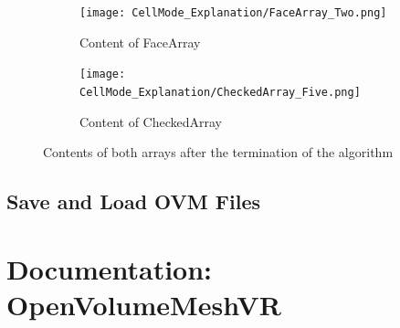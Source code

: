 \documentclass{report}
\begin{document}
		\begin{figure}[H]
			\centering
			\begin{subfigure}[H]{2.5in}
				\centering
				\texttt{[image: CellMode\_Explanation/FaceArray\_Two.png]}
				\caption{Content of FaceArray}
				\label{pic:pic5.8.a}
			\end{subfigure}
			\quad
			\begin{subfigure}[H]{2.5in}
				\centering
				\texttt{[image: CellMode\_Explanation/CheckedArray\_Five.png]}
				\caption{Content of CheckedArray}
				\label{pic:pic5.8.b}
			\end{subfigure}
			\caption{Contents of both arrays after the termination of the algorithm}
			\label{pic:pic5.8}
		\end{figure}
	\closesection
		
	\section{Save and Load OVM Files}
	\startsection
	\closesection

\chapter{Documentation: OpenVolumeMeshVR}


\newpage
{}

\end{document}
